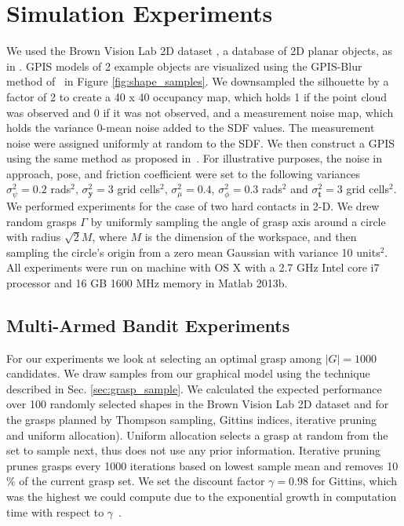 \documentclass[10pt, conference]{ieeeconf}      %
\newcommand{\bt}{\mathbf{t}}
\newcommand{\by}{\mathbf{y}}
\begin{document}
\section{Simulation Experiments}
We used the Brown Vision Lab 2D dataset \cite{brown}, a database of 2D planar objects, as in \cite{christopoulos2007handling}.
GPIS models of 2 example objects are visualized using the GPIS-Blur method of~\cite{mahler2015gp} in Figure \ref{fig:shape_samples}.
We downsampled the silhouette by a factor of 2 to create a 40 x 40 occupancy map, which holds 1 if the point cloud was observed and 0 if it was not observed, and a measurement noise map, which holds the variance 0-mean noise added to the SDF values.
The measurement noise were assigned uniformly at random to the SDF.
We then construct a GPIS using the same method as proposed in~\cite{mahler2015gp}.
For illustrative purposes, the noise in approach, pose, and friction coefficient were set to the following variances $\sigma_{\psi}^2 = 0.2$ rads$^2$, $\sigma_{\by}^2 = 3$ grid cells$^2$, $\sigma_{\mu}^2 = 0.4$, $\sigma_{\phi}^2 = 0.3$ rads$^2$ and $\sigma_{\bt}^2 = 3$ grid cells$^2$.
We  performed experiments for the case of two hard contacts in 2-D.
We drew random grasps $\Gamma$ by uniformly sampling the angle of grasp axis around a circle with radius $\sqrt{2} M$, where $M$ is the dimension of the workspace, and then sampling the circle's origin from a zero mean Gaussian with variance 10 units$^2$. All experiments were run on machine with OS X with a 2.7 GHz Intel core i7 processor and 16 GB 1600 MHz memory in Matlab 2013b.





\subsection{Multi-Armed Bandit Experiments}
For our experiments we look at selecting an optimal grasp among $|G| = 1000$ candidates. We draw samples from our graphical model using the technique described in Sec.  \ref{sec:grasp_sample}. We calculated the expected performance over 100 randomly selected shapes in the Brown Vision Lab 2D dataset and for the grasps planned by Thompson sampling, Gittins indices, iterative pruning~\cite{kehoe2012toward} and uniform allocation). Uniform allocation selects a grasp at random from the set to sample next, thus does not use any prior information. Iterative pruning prunes grasps every 1000 iterations based on lowest sample mean and removes 10$\%$ of the current grasp set.  We set the discount factor $\gamma =0.98$ for Gittins, which was the highest we could compute due to the exponential growth in computation time with respect to $\gamma$~\cite{gittins2011multi}. 
\end{document}
